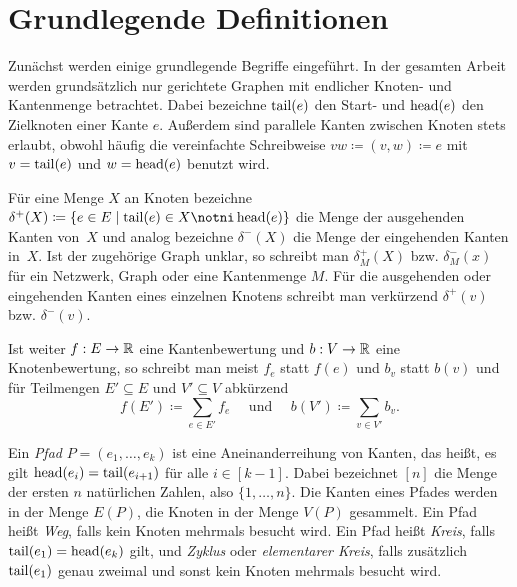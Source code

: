 \section{Grundlegende Definitionen}

Zunächst werden einige grundlegende Begriffe eingeführt.
In der gesamten Arbeit werden grundsätzlich nur gerichtete Graphen mit endlicher Knoten- und Kantenmenge betrachtet.
Dabei bezeichne $\operatorname{tail}(e)$ den Start- und $\operatorname{head}(e)$ den Zielknoten einer Kante $e$.
Außerdem sind parallele Kanten zwischen Knoten stets erlaubt, obwohl häufig die vereinfachte Schreibweise $vw\coloneq (v,w)\coloneq e$ mit $v=\operatorname{tail}(e)$ und $w=\operatorname{head}(e)$ benutzt wird.

Für eine Menge $X$ an Knoten bezeichne $\delta^+(X)\coloneq \{ e\in E \mid \tail(e) \in X \notni \head(e) \}$ die Menge der ausgehenden Kanten von~$X$ und analog bezeichne $\delta^-(X)$ die Menge der eingehenden Kanten in~$X$.
Ist der zugehörige Graph unklar, so schreibt man $\delta^+_M(X)$ bzw. $\delta^-_M(x)$ für ein Netzwerk, Graph oder eine Kantenmenge $M$.
Für die ausgehenden oder eingehenden Kanten eines einzelnen Knotens schreibt man verkürzend $\delta^+(v)$ bzw. $\delta^-(v)$.

Ist weiter $f: E \rightarrow \mathbb{R}$ eine Kantenbewertung und $b: V \rightarrow \mathbb{R}$ eine Knotenbewertung, so schreibt man meist $f_e$ statt $f(e)$ und $b_v$ statt $b(v)$ und für Teilmengen $E'\subseteq E$ und $V'\subseteq V$ abkürzend
\[ 
	f(E')\coloneq \sum_{e \in E'} f_e \text{~~~ und ~~~} b(V')\coloneq\sum_{v\in V'} b_v.
\]

Ein \emph{Pfad} $P=(e_1, \dots, e_k)$ ist eine Aneinanderreihung von Kanten, das heißt, es gilt $\operatorname{head}(e_i) = \operatorname{tail}(e_{i+1})$ für alle $i\in[k-1]$.
Dabei bezeichnet $[n]$ die Menge der ersten $n$ natürlichen Zahlen, also $\{ 1,\dots, n \}$.
Die Kanten eines Pfades werden in der Menge $E(P)$, die Knoten in der Menge $V(P)$ gesammelt.
Ein Pfad heißt \emph{Weg}, falls kein Knoten mehrmals besucht wird. 
Ein Pfad heißt \emph{Kreis}, falls $\operatorname{tail}(e_1) = \operatorname{head}(e_k)$ gilt, und \emph{Zyklus} oder \emph{elementarer Kreis}, falls zusätzlich $\operatorname{tail}(e_1)$ genau zweimal und sonst kein Knoten mehrmals besucht wird.

